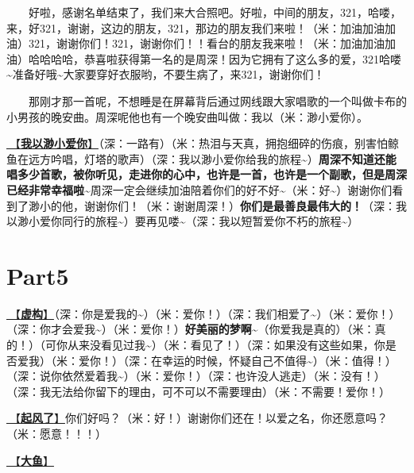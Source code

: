 \documentclass[]{ctexbook}
\begin{document}
  好啦，感谢名单结束了，我们来大合照吧。好啦，中间的朋友，321，哈喽，来，好321，谢谢，这边的朋友，321，那边的朋友我们来啦！（米：加油加油加油）321，谢谢你们！321，谢谢你们！！看台的朋友我来啦！（米：加油加油加油）哈哈哈哈，恭喜啦获得第一名的是周深！因为它拥有了这么多的爱，321哈喽\textasciitilde 准备好哦\textasciitilde 大家要穿好衣服哟，不要生病了，来321，谢谢你们！

  那刚才那一首呢，不想睡是在屏幕背后通过网线跟大家唱歌的一个叫做卡布的小男孩的晚安曲。周深呢他也有一个晚安曲叫做：我以（米：渺小爱你）。

\hyperref[loving-you-in-my-humble-way]{🎵【\textbf{我以渺小爱你}】}（深：一路有）（米：热泪与天真，拥抱细碎的伤痕，别害怕鲸鱼在远方吟唱，灯塔的歌声）（深：我以渺小爱你给我的旅程\textasciitilde）\textbf{周深不知道还能唱多少首歌，被你听见，走进你的心中，也许是一首，也许是一个副歌，但是周深已经非常幸福啦\textasciitilde{}}周深一定会继续加油陪着你们的好不好\textasciitilde（米：好\textasciitilde）谢谢你们看到了渺小的他，谢谢你们！（米：谢谢周深！）\textbf{你们是最善良最伟大的！}（深：我以渺小爱你同行的旅程\textasciitilde）要再见喽\textasciitilde（深：我以短暂爱你不朽的旅程\textasciitilde）

\section{Part5}\label{nanning-20241207-part5}

\hyperref[the-mask]{🎵【\textbf{虚构}】}（深：你是爱我的\textasciitilde）（米：爱你！）（深：我们相爱了\textasciitilde）（米：爱你！）（深：你才会爱我\textasciitilde）（米：爱你！）\textbf{好美丽的梦啊\textasciitilde{}}（你爱我是真的）（米：真的！）（可你从来没看见过我\textasciitilde）（米：看见了！）（深：如果没有这些如果，你是否爱我）（米：爱你！）（深：在幸运的时候，怀疑自己不值得\textasciitilde）（米：值得！）（深：说你依然爱着我\textasciitilde）（米：爱你！）（深：也许没人逃走）（米：没有！）（深：我无法给你留下的理由，可不可以不需要理由）（米：不需要！爱你！）

\hyperref[the-wind-rises]{🎵【\textbf{起风了}】}你们好吗？（米：好！）谢谢你们还在！以爱之名，你还愿意吗？（米：愿意！！！）

\hyperref[big-fish]{🎵【\textbf{大鱼}】}
\end{document}
